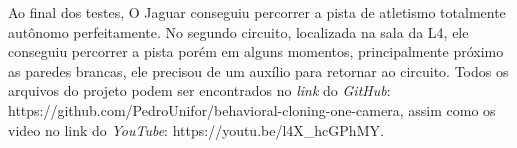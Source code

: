 Ao final dos testes, O Jaguar conseguiu percorrer a pista de atletismo totalmente autônomo perfeitamente. No segundo circuito, localizada na sala da L4, ele conseguiu percorrer a pista porém em alguns momentos, principalmente próximo as paredes brancas, ele precisou de um auxílio para retornar ao circuito.
Todos os arquivos do projeto podem ser encontrados no \textit{link} do \textit{GitHub}: https://github.com/PedroUnifor/behavioral-cloning-one-camera, assim como os video no link do \textit{YouTube}:
https://youtu.be/l4X\_hcGPhMY.